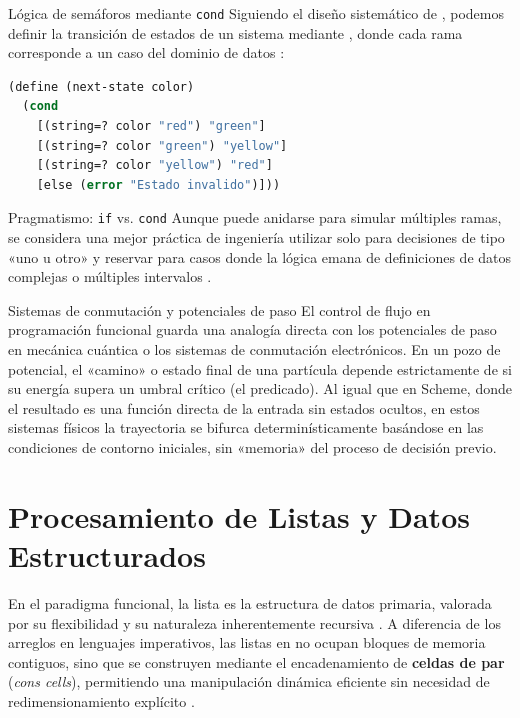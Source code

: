 \begin{ejemplo}{Lógica de semáforos mediante \texttt{cond}}
Siguiendo el diseño sistemático de \cite{HtDP}, podemos definir la transición de estados de un sistema mediante , donde cada rama corresponde a un caso del dominio de datos \cite{HtDP}:
\begin{lstlisting}[language=Lisp, caption={Transición de estados en Scheme}]
(define (next-state color)
  (cond
    [(string=? color "red") "green"]
    [(string=? color "green") "yellow"]
    [(string=? color "yellow") "red"]
    [else (error "Estado invalido")]))
\end{lstlisting}
\end{ejemplo}

\begin{observacion}{Pragmatismo: \texttt{if} vs. \texttt{cond}}
Aunque  puede anidarse para simular múltiples ramas, se considera una mejor práctica de ingeniería utilizar  solo para decisiones de tipo «uno u otro» y reservar  para casos donde la lógica emana de definiciones de datos complejas o múltiples intervalos \cite{HtDP, SICP}.
\end{observacion}

\begin{fisicaconexion}{Sistemas de conmutación y potenciales de paso}
El control de flujo en programación funcional guarda una analogía directa con los potenciales de paso en mecánica cuántica o los sistemas de conmutación electrónicos. En un pozo de potencial, el «camino» o estado final de una partícula depende estrictamente de si su energía supera un umbral crítico (el predicado). Al igual que en Scheme, donde el resultado es una función directa de la entrada sin estados ocultos, en estos sistemas físicos la trayectoria se bifurca determinísticamente basándose en las condiciones de contorno iniciales, sin «memoria» del proceso de decisión previo.
\end{fisicaconexion}


\section{Procesamiento de Listas y Datos Estructurados}
\label{sec:4_3_listas}

En el paradigma funcional, la lista es la estructura de datos primaria, valorada por su flexibilidad y su naturaleza inherentemente recursiva \cite{SICP, HtDP}. A diferencia de los arreglos en lenguajes imperativos, las listas en  no ocupan bloques de memoria contiguos, sino que se construyen mediante el encadenamiento de \textbf{celdas de par} (\textit{cons cells}), permitiendo una manipulación dinámica eficiente sin necesidad de redimensionamiento explícito \cite{SICP}.

